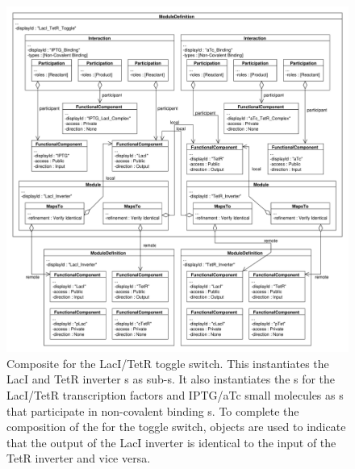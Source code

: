 \begin{figure}[ht]
\begin{center}
\includegraphics[width=\textwidth]{example_uml/toggle_4}
\caption[]{Composite  for the LacI/TetR toggle switch. This  instantiates the LacI and TetR inverter s as sub-s. It also instantiates the s for the LacI/TetR transcription factors and IPTG/aTc small molecules as s that participate in non-covalent binding s. To complete the composition of the  for the toggle switch,  objects are used to indicate that the output of the LacI inverter is identical to the input of the TetR inverter and vice versa.
}
\label{uml:ex_mod_def_compo}
\end{center}
\end{figure}



